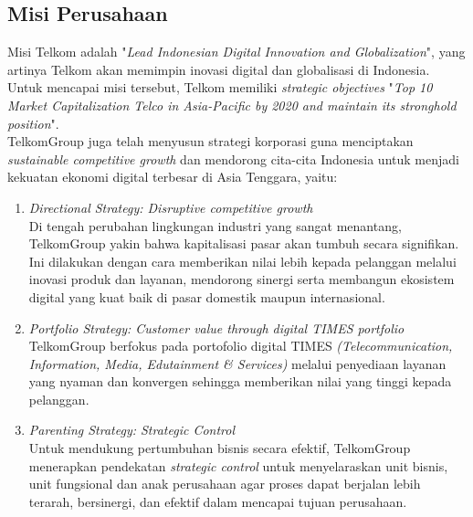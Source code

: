 \subsection{Misi Perusahaan}
\tab Misi Telkom adalah "\textit{Lead Indonesian Digital Innovation and Globalization}", yang artinya Telkom akan memimpin inovasi digital dan globalisasi di Indonesia. Untuk mencapai misi tersebut, Telkom memiliki \textit{strategic objectives} "\textit{Top 10 Market Capitalization Telco in Asia-Pacific by 2020 and maintain its stronghold position}".\\
\tab TelkomGroup juga telah menyusun strategi korporasi guna menciptakan \textit{sustainable competitive growth} dan mendorong cita-cita Indonesia untuk menjadi kekuatan ekonomi digital terbesar di Asia Tenggara, yaitu:
	\begin{enumerate}
		\item \textit{Directional Strategy: Disruptive competitive growth}\\
		\tab Di tengah perubahan lingkungan industri yang sangat menantang, TelkomGroup yakin bahwa kapitalisasi pasar akan tumbuh secara signifikan. Ini dilakukan dengan cara memberikan nilai lebih kepada pelanggan melalui inovasi produk dan layanan, mendorong sinergi serta membangun ekosistem digital yang kuat baik di pasar domestik maupun internasional.
		\item \textit{Portfolio Strategy: Customer value through digital TIMES portfolio}\\
		\tab TelkomGroup berfokus pada portofolio digital TIMES \textit{(Telecommunication, Information, Media, Edutainment \& Services)} melalui penyediaan layanan yang nyaman dan konvergen sehingga memberikan nilai yang tinggi kepada pelanggan.
		\item \textit{Parenting Strategy: Strategic Control}\\
		\tab Untuk mendukung pertumbuhan bisnis secara efektif, TelkomGroup menerapkan pendekatan \textit{strategic control} untuk menyelaraskan unit bisnis, unit fungsional dan anak perusahaan agar proses dapat berjalan lebih terarah, bersinergi, dan efektif dalam mencapai tujuan perusahaan.
	\end{enumerate}

